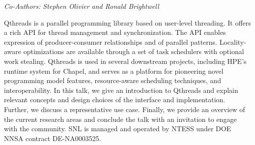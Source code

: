 \begin{center}
\textit{Co-Authors: Stephen Olivier and Ronald	 Brightwell}
\end{center} 
Qthreads is a parallel programming library based on user-level threading. It offers a rich API for thread management and synchronization. The API enables expression of producer-consumer relationships and of parallel patterns. Locality-aware optimizations are available through a set of task schedulers with optional work stealing. Qthreads is used in several downstream projects, including HPE’s runtime system for Chapel, and serves as a platform for pioneering novel programming model features, resource-aware scheduling techniques, and interoperability. In this talk, we give an introduction to Qthreads and explain relevant concepts and design choices of the interface and implementation. Further, we discuss a representative use case. Finally, we provide an overview of the current research areas and conclude the talk with an invitation to engage with the community. SNL is managed and operated by NTESS under DOE NNSA contract DE-NA0003525.